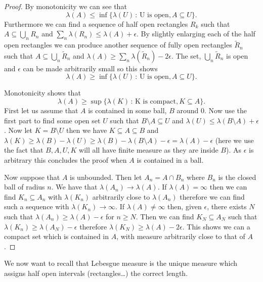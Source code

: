 \documentclass[
]{book}
\theoremstyle{definition}
\theoremstyle{definition}
\theoremstyle{definition}
\theoremstyle{definition}
\theoremstyle{remark}
\begin{document}
\begin{proof}
By monotonicity we can see that \[\lambda(A) \leq \inf \{ \lambda(U)\,:\, \mbox{U is open}, A \subseteq U\}.\]
Furthermore we can find a sequence of half open rectangles \(R_k\) such that \(A \subseteq \bigcup_n R_n\) and \(\sum_n \lambda(R_n) \leq \lambda(A) + \epsilon\). By slightly enlarging each of the half open rectangles we can produce another sequence of fully open rectangles \(\tilde{R}_n\) such that \(A \subseteq \bigcup_n \tilde{R}_n\) and \(\lambda(A) \geq \sum_n \lambda(\tilde{R}_n)-2\epsilon\). The set, \(\bigcup_n \tilde{R}_n\) is open and \(\epsilon\) can be made arbitrarily small so this shows \[\lambda(A) \geq \inf \{ \lambda(U)\,:\, \mbox{U is open}, A \subseteq U\}.\]

Monotonicity shows that \[\lambda(A) \geq \sup \{ \lambda(K)\,:\, \mbox{K is compact}, K \subseteq A\}.\] First let us assume that \(A\) is contained in some ball, \(B\) around 0. Now use the first part to find some open set \(U\) such that \(B \setminus A \subseteq U\) and \(\lambda(U) \leq \lambda(B \setminus A) + \epsilon\). Now let \(K = B \setminus U\) then we have \(K \subseteq A \subseteq B\) and \(\lambda(K) \geq \lambda(B) - \lambda(U) \geq \lambda(B) - \lambda(B \setminus A) - \epsilon = \lambda(A) - \epsilon\) (here we use the fact that \(B, A, U, K\) will all have finite measure as they are inside \(B\)). As \(\epsilon\) is arbitrary this concludes the proof when \(A\) is contained in a ball.

Now suppose that \(A\) is unbounded. Then let \(A_n = A \cap B_n\) where \(B_n\) is the closed ball of radius \(n\). We have that \(\lambda(A_n) \rightarrow \lambda(A)\). If \(\lambda(A) = \infty\) then we can find \(K_n \subseteq A_n\) with \(\lambda(K_n)\) arbitrarily close to \(\lambda(A_n)\) therefore we can find such a sequence with \(\lambda(K_n) \rightarrow \infty\). If \(\lambda(A) \neq \infty\) then, given \(\epsilon\), there exists \(N\) such that \(\lambda(A_n) \geq \lambda(A)-\epsilon\) for \(n \geq N\). Then we can find \(K_N \subseteq A_N\) such that \(\lambda(K_n) \geq \lambda(A_N) - \epsilon\) therefore \(\lambda(K_N) \geq \lambda(A)- 2 \epsilon\). This shows we can a compact set which is contained in \(A\), with measure arbitrarily close to that of \(A\).
\end{proof}

We now want to recall that Lebesgue measure is the unique measure which assigns half open intervals (rectangles\ldots) the correct length.
\end{document}
